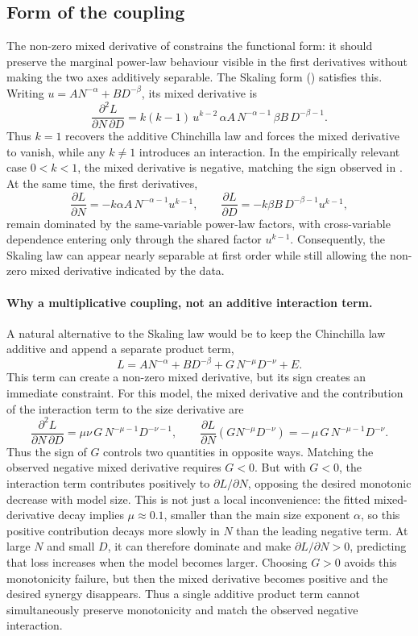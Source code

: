 \documentclass[]{fairmeta}
\newcommand{\ska}{Skaling}
\begin{document}
\subsection{Form of the coupling}
\label{app:cross_deriv}
The non-zero mixed derivative of  constrains the functional form: it should preserve the marginal power-law behaviour visible in the first derivatives without making the two axes additively separable. The \ska{} form () satisfies this. Writing $u=A N^{-\alpha}+B D^{-\beta}$, its mixed derivative is
\[
\frac{\partial^{2}L}{\partial N\,\partial D}
=
k(k-1)\,u^{k-2}\,
\alpha A\,N^{-\alpha-1}\,
\beta B\,D^{-\beta-1}.
\]
Thus $k=1$ recovers the additive Chinchilla law and forces the mixed derivative to vanish, while any $k\neq1$ introduces an interaction. In the empirically relevant case $0<k<1$, the mixed derivative is negative, matching the sign observed in . At the same time, the first derivatives,
\[
\frac{\partial L}{\partial N}
=
-k\alpha A\,N^{-\alpha-1}u^{k-1},
\qquad
\frac{\partial L}{\partial D}
=
-k\beta B\,D^{-\beta-1}u^{k-1},
\]
remain dominated by the same-variable power-law factors, with cross-variable dependence entering only through the shared factor $u^{k-1}$. Consequently, the \ska{} law can appear nearly separable at first order while still allowing the non-zero mixed derivative indicated by the data.

\paragraph{Why a multiplicative coupling, not an additive interaction term.} A natural alternative to the \ska{} law would be to keep the Chinchilla law additive and append a separate product term,
\[
L = A N^{-\alpha} + B D^{-\beta} + G\,N^{-\mu}D^{-\nu} + E .
\]
This term can create a non-zero mixed derivative, but its sign creates an immediate constraint. For this model, the mixed derivative and the contribution of the interaction term to the size derivative are
\[
\frac{\partial^2 L}{\partial N\,\partial D}
=\mu\nu\,G\,N^{-\mu-1}D^{-\nu-1},
\qquad
\frac{\partial L}{\partial N}\!\left(GN^{-\mu}D^{-\nu}\right)
=-\,\mu\,G\,N^{-\mu-1}D^{-\nu}.
\]
Thus the sign of $G$ controls two quantities in opposite ways. Matching the observed negative mixed derivative requires $G<0$. But with $G<0$, the interaction term contributes positively to $\partial L/\partial N$, opposing the desired monotonic decrease with model size. This is not just a local inconvenience: the fitted mixed-derivative decay implies $\mu\approx0.1$, smaller than the main size exponent $\alpha$, so this positive contribution decays more slowly in $N$ than the leading negative term. At large $N$ and small $D$, it can therefore dominate and make $\partial L/\partial N>0$, predicting that loss increases when the model becomes larger. Choosing $G>0$ avoids this monotonicity failure, but then the mixed derivative becomes positive and the desired synergy disappears. Thus a single additive product term cannot simultaneously preserve monotonicity and match the observed negative interaction.
\end{document}
